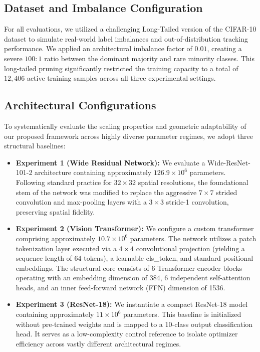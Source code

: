 \documentclass[conference]{IEEEtran}
\begin{document}
\subsection{Dataset and Imbalance Configuration}
For all evaluations, we utilized a challenging Long-Tailed
version of the CIFAR-10 dataset to simulate real-world label imbalances and out-of-distribution tracking performance. We
applied an architectural imbalance factor of $0.01$, creating a severe
$100:1$ ratio between the dominant majority and rare minority classes. This long-tailed pruning significantly restricted
the training capacity to a total of $12{,}406$ active training samples
across all three experimental settings.

\subsection{Architectural Configurations}
\label{subsec:architectures}

To systematically evaluate the scaling properties and geometric adaptability of our proposed framework across highly diverse parameter regimes, we adopt three structural baselines:

\begin{itemize}
    \item \textbf{Experiment 1 (Wide Residual Network):} We evaluate a Wide-ResNet-101-2 architecture containing approximately $126.9\times 10^6$ parameters. Following standard practice for $32 \times 32$ spatial resolutions, the foundational stem of the network was modified to replace the aggressive $7 \times 7$ strided convolution and max-pooling layers with a $3 \times 3$ stride-1 convolution, preserving spatial fidelity.
    
     \item \textbf{Experiment 2 (Vision Transformer):} We configure a custom transformer comprising approximately $10.7\times 10^6$ parameters. The network utilizes a patch tokenization layer executed via a $4\times 4$ convolutional projection (yielding a sequence length of 64 tokens), a learnable cls\_token, and standard positional embeddings. The structural core consists of 6 Transformer encoder blocks operating with an embedding dimension of 384, 6 independent self-attention heads, and an inner feed-forward network (FFN) dimension of 1536.
    
    \item \textbf{Experiment 3 (ResNet-18):} We instantiate a compact ResNet-18 model containing approximately $11\times 10^6$ parameters. This baseline is initialized without pre-trained weights and is mapped to a 10-class output classification head. It serves as a low-complexity control reference to isolate optimizer efficiency across vastly different architectural regimes.
\end{itemize}
\end{document}
